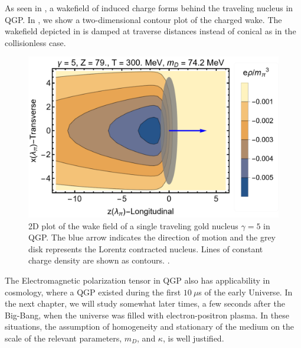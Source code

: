 As seen in , a wakefield of induced charge forms behind the traveling nucleus in QGP. In , we show a two-dimensional contour plot of the charged wake. The wakefield depicted in  is damped at traverse distances instead of conical as in the collisionless case.
\begin{figure}[ht]
\centering
\includegraphics[width=0.85\linewidth]{plots/chap02QCD/chwake.png}
\caption{2D plot of the wake field of a single traveling gold nucleus $\gamma = 5$ in QGP. The blue arrow indicates the direction of motion and the grey disk represents the Lorentz contracted nucleus. Lines of constant charge density are shown as contours. .\label{fig:chgwake}}
\end{figure}


The Electromagnetic polarization tensor in QGP also has applicability in cosmology, where a QGP existed during the first $10~\mu$s of the early Universe. In the next chapter, we will study somewhat later times, a few seconds after the Big-Bang, when the universe was filled with electron-positron plasma. In these situations, the assumption of homogeneity and stationary of the medium on the scale of the relevant parameters, $m_D$, and $\kappa$, is well justified.
